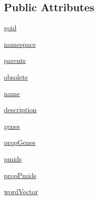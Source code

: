 \subsection*{Public Attributes}
\begin{DoxyCompactItemize}
\item 
\hyperlink{class_g_o_node_1_1_g_o_node_a419738231e6061c8f35c7038600045b5}{goid}
\item 
\hyperlink{class_g_o_node_1_1_g_o_node_a14d769d661d7dad68b451d0ee40dc7c8}{namespace}
\item 
\hyperlink{class_g_o_node_1_1_g_o_node_a0e5b6b8b5e9b4a88ff0752017d90f544}{parents}
\item 
\hyperlink{class_g_o_node_1_1_g_o_node_a21c9f4840075c55ca91a59d4e7907f1f}{obsolete}
\item 
\hyperlink{class_g_o_node_1_1_g_o_node_a18b00948dd27ef1af426a1b8a522467d}{name}
\item 
\hyperlink{class_g_o_node_1_1_g_o_node_ad22366488d580d7aa91527f0b592d64d}{description}
\item 
\hyperlink{class_g_o_node_1_1_g_o_node_a6d2a26f14532a49bd13f133eb510f9d9}{genes}
\item 
\hyperlink{class_g_o_node_1_1_g_o_node_a2da5aad6a2dd0fde698f3b9f38d71a9d}{propGenes}
\item 
\hyperlink{class_g_o_node_1_1_g_o_node_af84d73aa3de8f64e8bb037db8e19c285}{pmids}
\item 
\hyperlink{class_g_o_node_1_1_g_o_node_a495556a257907681a0b0d29c72a07095}{propPmids}
\item 
\hyperlink{class_g_o_node_1_1_g_o_node_a74ee778a5586a4ed340a003f9172e78e}{wordVector}
\end{DoxyCompactItemize}



